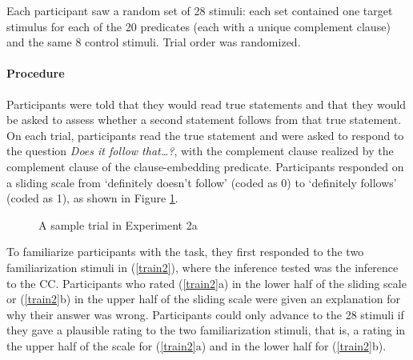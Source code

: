 \documentclass[11pt,fleqn]{article}
\newcommand{\6}{\mbox{$[\hspace*{-.6mm}[$}}
\newcommand{\9}{\mbox{$]\hspace*{-.6mm}]$}}
\begin{document}
Each participant saw a random set of 28 stimuli: each set contained one target stimulus for each of the 20 predicates (each with a unique complement clause) and the same 8 control stimuli. Trial order was randomized.

\paragraph{Procedure} Participants were told that they would read true statements and that they would be asked to assess whether a second statement follows from that true statement. On each trial, participants read the true statement and were asked to respond to the question {\em Does it follow that\ldots?}, with the complement clause realized by the complement clause of the clause-embedding predicate. Participants responded on a sliding scale from `definitely doesn't follow' (coded as 0) to `definitely follows' (coded as 1), as shown in Figure \ref{f-trial-exp3}.

\begin{figure}[H]
\begin{center}
\end{center}
\caption{A sample trial in Experiment 2a}\label{f-trial-exp3}
\end{figure}

To familiarize participants with the task, they first responded to the two familiarization stimuli in (\ref{train2}), where the inference tested was the inference to the CC. Participants who rated (\ref{train2}a) in the lower half of the sliding scale or (\ref{train2}b) in the upper half of the sliding scale were given an explanation for why their answer was wrong. Participants could only advance to the 28 stimuli if they gave a plausible rating to the two familiarization stimuli, that is, a rating in the upper half of the scale for (\ref{train2}a) and in the lower half for (\ref{train2}b).
\end{document}
